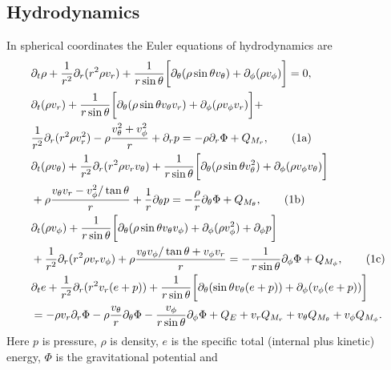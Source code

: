 \subsection{Hydrodynamics}
In spherical coordinates the Euler equations of hydrodynamics are 
\begin{alignat}{1}
&\partial_t \rho + \frac{1}{r^2} \partial_r (r^2 \rho v_r) + \frac{1}{r \sin{\theta}} \bigg[ \partial_{\theta} (\rho \sin{\theta} v_{\theta}) + \partial_{\phi} (\rho v_{\phi}) \bigg] = 0, \label{eqN:cont} \\
\stepcounter{equation}
&\partial_t (\rho v_r) + \frac{1}{r \sin{\theta}} \bigg[ \partial_{\theta} (\rho \sin{\theta} v_{\theta} v_r)
+\partial_{\phi} (\rho v_{\phi} v_r) \bigg]  + \nonumber \\ 
&\frac{1}{r^2} \partial_r (r^2 \rho v_r^2)  - \rho \frac{v_{\theta}^2 + v_{\phi}^2}{r} + \partial_r p 
= - \rho \partial_r \Phi + Q_{M_r}, \tag{\theequation{}a} \\
%
&\partial_t (\rho v_{\theta}) + \frac{1}{r^2} \partial_r (r^2 \rho v_r v_{\theta}) + \frac{1}{r \sin{\theta}}\bigg[ \partial_{\theta} (\rho \sin{\theta} v_{\theta}^2) +
\partial_{\phi} (\rho v_{\phi} v_{\theta}) \bigg] \nonumber \\
&+\rho \frac{v_{\theta}v_r - v_{\phi}^2/\tan{\theta}}{r} + \frac{1}{r}\partial_{\theta} p = - \frac{\rho}{r} \partial_{\theta} \Phi + Q_{M_{\theta}}, \tag{\theequation{}b} \\
%
&\partial_t (\rho v_{\phi})  
+\frac{1}{r \sin{\theta}} \bigg[ \partial_{\theta} (\rho \sin{\theta} v_{\theta} v_{\phi}) +
\partial_{\phi} (\rho v_{\phi}^2)  + \partial_{\phi} p  \bigg] \nonumber \\
&+ \frac{1}{r^2} \partial_r (r^2 \rho v_r v_{\phi}) +
\rho \frac{v_{\theta}v_{\phi}/\tan{\theta} + v_{\phi}v_r}{r}
 = -\frac{1}{r \sin{\theta}} \partial_{\phi} \Phi + Q_{M_{\phi}}, \tag{\theequation{}c} \\
%
\stepcounter{equation}
&\partial_t e + \frac{1}{r^2} \partial_r (r^2 v_r (e + p))
+\frac{1}{r \sin{\theta}} \bigg[ \partial_{\theta} ( \sin{\theta} v_{\theta} (e + p))  +
\partial_{\phi} (v_{\phi} (e + p)) \bigg] \nonumber \\
&= -\rho v_r \partial_r \Phi - \rho\frac{v_{\theta}}{r}\partial_{\theta}\Phi - \frac{v_{\phi}}{r \sin{\theta}} \partial_{\phi} \Phi
 + Q_E + v_r Q_{M_r} + v_{\theta} Q_{M_{\theta}} + v_{\phi} Q_{M_{\phi}}.
\end{alignat}
Here $p$ is pressure, $\rho$ is density, $e$ is the specific total (internal plus kinetic) energy,  $\Phi$ is the gravitational potential and

